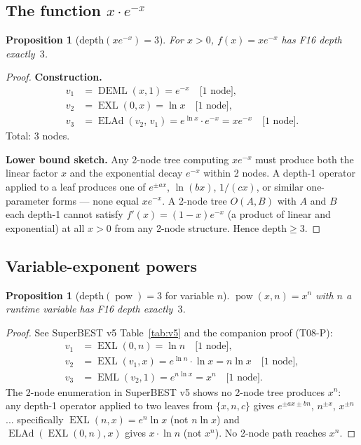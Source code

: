 \documentclass[12pt,a4paper]{article}
\newtheorem{proposition}[theorem]{Proposition}
\theoremstyle{definition}
\theoremstyle{remark}
\newcommand{\EML}{\operatorname{EML}}
\newcommand{\EXL}{\operatorname{EXL}}
\newcommand{\DEML}{\operatorname{DEML}}
\newcommand{\ELAd}{\operatorname{ELAd}}
\newcommand{\powop}{\operatorname{pow}}
\begin{document}
\subsection{The function $x \cdot e^{-x}$}

\begin{proposition}[depth$(x e^{-x}) = 3$]
\label{prop:xexpneg}
For $x > 0$, $f(x) = x e^{-x}$ has F16 depth exactly~$3$.
\end{proposition}

\begin{proof}
\textbf{Construction.}
\begin{align*}
  v_1 &= \DEML(x,1) = e^{-x} \quad\text{[1 node]}, \\
  v_2 &= \EXL(0,x) = \ln x \quad\text{[1 node]}, \\
  v_3 &= \ELAd(v_2,\, v_1) = e^{\ln x} \cdot e^{-x} = x e^{-x} \quad\text{[1 node]}.
\end{align*}
Total: 3 nodes.

\textbf{Lower bound sketch.}
Any 2-node tree computing $xe^{-x}$ must produce both the linear factor $x$
and the exponential decay $e^{-x}$ within 2 nodes.  A depth-1 operator applied
to a leaf produces one of $e^{\pm ax}$, $\ln(bx)$, $1/(cx)$, or similar
one-parameter forms --- none equal $xe^{-x}$.  A 2-node tree $O(A,B)$ with
$A$ and $B$ each depth-1 cannot satisfy $f'(x) = (1-x)e^{-x}$
(a product of linear and exponential) at all $x > 0$ from any 2-node structure.
Hence depth$\geq 3$.
\end{proof}

\subsection{Variable-exponent powers}

\begin{proposition}[depth$(\powop) = 3$ for variable $n$]
\label{prop:pow}
$\powop(x,n) = x^n$ with $n$ a runtime variable has F16 depth exactly~$3$.
\end{proposition}

\begin{proof}
See SuperBEST v5 Table~\ref{tab:v5} and the companion proof (T08-P):
\begin{align*}
  v_1 &= \EXL(0,n) = \ln n \quad\text{[1 node]}, \\
  v_2 &= \EXL(v_1, x) = e^{\ln n} \cdot \ln x = n \ln x \quad\text{[1 node]}, \\
  v_3 &= \EML(v_2, 1) = e^{n\ln x} = x^n \quad\text{[1 node]}.
\end{align*}
The 2-node enumeration in SuperBEST v5 shows no 2-node tree produces $x^n$:
any depth-1 operator applied to two leaves from $\{x,n,c\}$ gives
$e^{\pm ax\pm bn}$, $n^{\pm x}$, $x^{\pm n}$... specifically
$\EXL(n,x) = e^n \ln x$ (not $n \ln x$) and $\ELAd(\EXL(0,n), x)$
gives $x \cdot \ln n$ (not $x^n$).  No 2-node path reaches $x^n$.
\end{proof}
\end{document}
